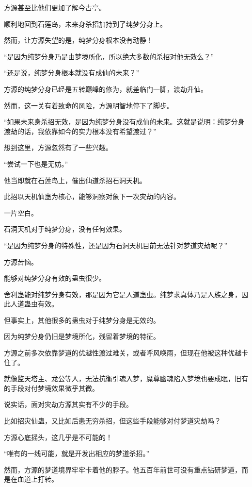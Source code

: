 \begin{this_body}
方源甚至比他们更加了解今古亭。

顺利地回到石莲岛，未来身杀招加持到了纯梦分身上。

然而，让方源失望的是，纯梦分身根本没有动静！

“是因为纯梦分身乃是由梦境所化，所以绝大多数的杀招对他无效么？”

“还是说，纯梦分身根本就没有成仙的未来？”

方源的纯梦分身已经是五转巅峰的修为，就差临门一脚，渡劫升仙。

然而，这一关有着致命的风险，方源明智地停下了脚步。

“如果未来身杀招无效，是因为纯梦分身没有成仙的未来。这就是说明：纯梦分身渡劫的话，我依靠如今的实力根本没有希望渡过？”

想到这里，方源忽然有了一些兴趣。

“尝试一下也是无妨。”

他当即就在石莲岛上，催出仙道杀招石洞天机。

此招以天机仙蛊为核心，能够洞察对象下一次灾劫的内容。

一片空白。

石洞天机对于纯梦分身，没有任何效果。

“是因为纯梦分身的特殊性，还是因为石洞天机目前无法针对梦道灾劫呢？”

方源苦恼。

能够对纯梦分身有效的蛊虫很少。

舍利蛊能对纯梦分身有效，那是因为它是人道蛊虫。纯梦求真体乃是人族之身，因此人道蛊虫有效。

但事实上，其他很多的蛊虫对于纯梦分身是无效的。

因为纯梦分身仍旧是梦境所化，残留着梦境的特征。

方源之前多次依靠梦道的优越性渡过难关，或者呼风唤雨，但现在他被这种优越卡住了。

就像监天塔主、龙公等人，无法抗衡引魂入梦，魔尊幽魂陷入梦境也要成眠，旧有的手段对付梦境效果微乎其微。

说实话，面对灾劫方源其实有不少的手段。

比如招灾仙蛊，又比如后患无穷杀招，但这些手段能够对付梦道灾劫吗？

方源心底摇头，这几乎是不可能的！

“唯有的一线可能，就是开发出相应的梦道杀招。”

然而，方源的梦道境界牢牢卡着他的脖子。他五百年前世可没有重点钻研梦道，而是在血道上打转。


\end{this_body}
